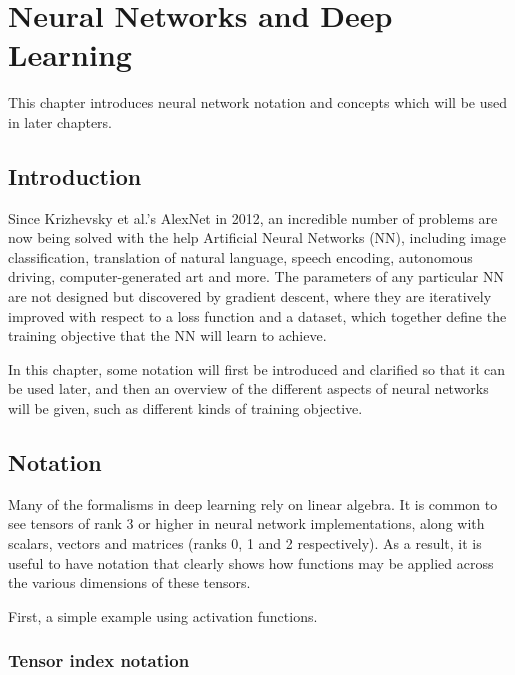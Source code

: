 \chapter{Neural Networks and Deep Learning}
\label{C:background}

This chapter introduces neural network notation and concepts which will be used in later chapters.

\section{Introduction}

Since Krizhevsky et al.'s AlexNet \cite{alexnet} in 2012, an incredible number of problems are now being solved with the help Artificial Neural Networks (NN), including image classification, translation of natural language, speech encoding, autonomous driving, computer-generated art and more. The parameters of any particular NN are not designed but discovered by gradient descent, where they are iteratively improved with respect to a loss function and a dataset, which together define the training objective that the NN will learn to achieve.

In this chapter, some notation will first be introduced and clarified so that it can be used later, and then an overview of the different aspects of neural networks will be given, such as different kinds of training objective.

\section{Notation}
\label{ss:dl-notation}

Many of the formalisms in deep learning rely on linear algebra. It is common to see tensors of rank 3 or higher in neural network implementations, along with scalars, vectors and matrices (ranks 0, 1 and 2 respectively). As a result, it is useful to have notation that clearly shows how functions may be applied across the various dimensions of these tensors.

First, a simple example using activation functions.

\subsection{Tensor index notation}

